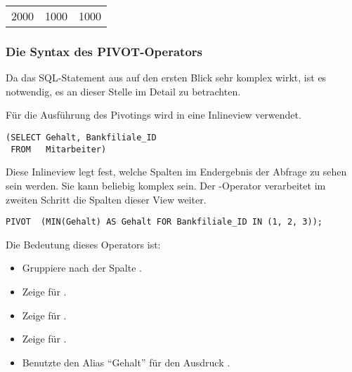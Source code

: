 \begin{center}
    \begin{small}
        \tablehead{}

        \begin{oraclesql}
            \begin{supertabular}{rrr}
                2000 & 1000 & 1000 \\
            \end{supertabular}
        \end{oraclesql}
    \end{small}
\end{center}
\subsubsection{Die Syntax des PIVOT-Operators}
Da das SQL-Statement aus  auf den ersten Blick sehr komplex wirkt, ist es notwendig, es an dieser Stelle im Detail zu betrachten.

Für die Ausführung des Pivotings wird in  eine Inlineview verwendet.
\begin{lstlisting}[language=oracle_sql,caption={Die Inlineview},label=sql06_18]
(SELECT Gehalt, Bankfiliale_ID
 FROM   Mitarbeiter)
          \end{lstlisting}
Diese Inlineview legt fest, welche Spalten im Endergebnis der Abfrage zu sehen sein werden. Sie kann beliebig komplex sein. Der -Operator verarbeitet im zweiten Schritt die Spalten dieser View weiter.
\begin{lstlisting}[language=oracle_sql,caption={Der \languageorasql{PIVOT}-Operator},label=sql06_19]
PIVOT  (MIN(Gehalt) AS Gehalt FOR Bankfiliale_ID IN (1, 2, 3));
          \end{lstlisting}
		  \clearpage
Die Bedeutung dieses Operators ist:
\begin{itemize}
    \item Gruppiere nach der Spalte .
    \item Zeige  für .
    \item Zeige  für .
    \item Zeige  für .
    \item Benutzte den Alias \enquote{Gehalt} für den Ausdruck .
\end{itemize}

